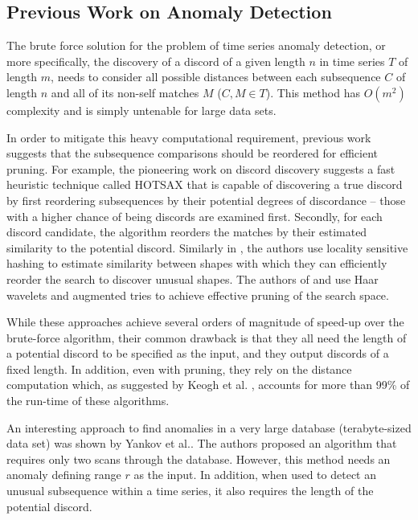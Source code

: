 \documentclass{llncs}
\begin{document}
\subsection{Previous Work on Anomaly Detection}
The brute force solution for the problem of time series anomaly detection, or more specifically, the discovery of a discord of a given length $n$ in time series $T$ of length $m$, needs to consider all possible distances between each subsequence $C$ of length $n$ and all of its non-self matches $M$ ($C,M \in T$). This method has $O(m^{2})$ complexity and is simply untenable for large data sets. 

In order to mitigate this heavy computational requirement, previous work suggests that the subsequence comparisons should be reordered for efficient pruning. For example, the pioneering work on discord discovery suggests a fast heuristic technique called HOTSAX \cite{hot_sax} that is capable of discovering a true discord by first reordering subsequences by their potential degrees of discordance -- those with a higher chance of being discords are examined first. Secondly, for each discord candidate, the algorithm reorders the matches by their estimated similarity to the potential discord. Similarly in \cite{hashing}, the authors use locality sensitive hashing to estimate similarity between shapes with which they can efficiently reorder the search to discover unusual shapes. The authors of \cite{haar_1} and \cite{haar_2} use Haar wavelets and augmented tries to achieve effective pruning of the search space.

While these approaches achieve several orders of magnitude of speed-up over the brute-force algorithm, their common drawback is that they all need the length of a potential discord to be specified as the input,  and they output discords of a fixed length. %
In addition, even with pruning, they rely on the distance computation which, as suggested by Keogh et al.  \cite{hot_sax}, accounts for more than 99\% of the run-time of these algorithms.  

An interesting approach to find anomalies in a very large database (terabyte-sized data set) was shown by Yankov et al.\cite{disk}. The authors proposed an algorithm that requires only two scans through the database. However, this method needs an anomaly defining range $r$ as the input. In addition, when used to detect an unusual subsequence within a time series, it also requires the length of the potential discord.
\end{document}
